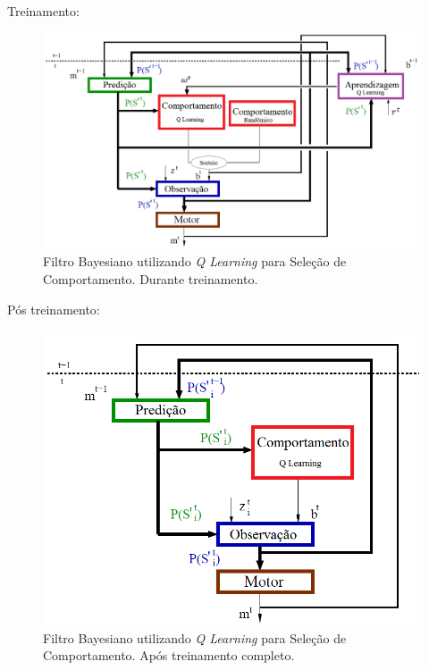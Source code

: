 \documentclass{beamer}
\begin{document}

\begin{frame}
Treinamento:

\begin{figure}[H]
    \centering
    \includegraphics[width=\linewidth]{images/modelo_bayesiano_treino-tiago}
    \caption{Filtro Bayesiano utilizando \textit{Q Learning} para Seleção de Comportamento. Durante treinamento.}
    \label{img:ModeloFinalTreinamento}
\end{figure}
\end{frame}


\begin{frame}
Pós treinamento:

\begin{figure}[h!]
    \centering
    \includegraphics[height=0.7\textheight]{images/modelo_bayesiano_final-tiago}
    \caption{Filtro Bayesiano utilizando \textit{Q Learning} para Seleção de Comportamento. Após treinamento completo.}
    \label{img:ModeloFinalPosTreinamento}
\end{figure}
\end{frame}
\end{document}
